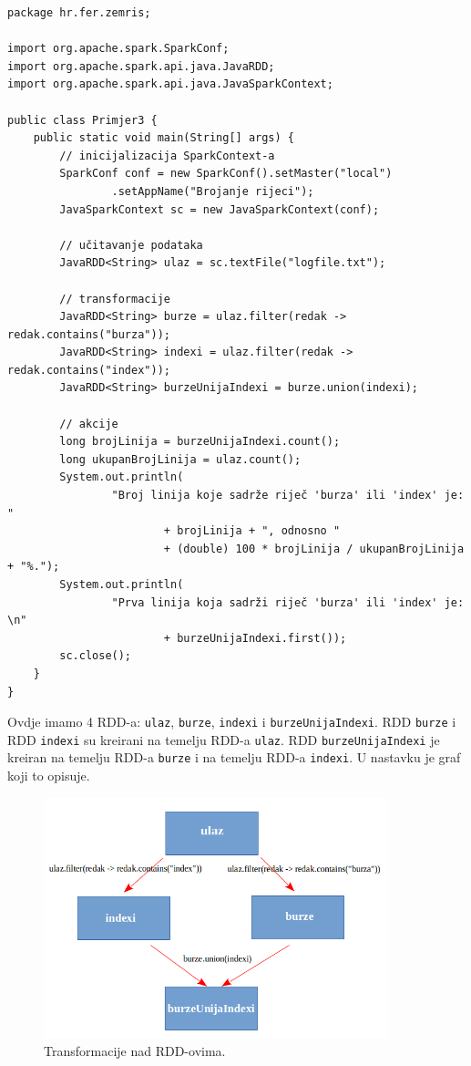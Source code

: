 \documentclass[times, utf8, zavrsni]{fer}
\begin{document}
\vspace{5mm}
\begin{lstlisting}
package hr.fer.zemris;

import org.apache.spark.SparkConf;
import org.apache.spark.api.java.JavaRDD;
import org.apache.spark.api.java.JavaSparkContext;

public class Primjer3 {
	public static void main(String[] args) {
		// inicijalizacija SparkContext-a
		SparkConf conf = new SparkConf().setMaster("local")
				.setAppName("Brojanje rijeci");
		JavaSparkContext sc = new JavaSparkContext(conf);

		// učitavanje podataka
		JavaRDD<String> ulaz = sc.textFile("logfile.txt");

		// transformacije
		JavaRDD<String> burze = ulaz.filter(redak -> redak.contains("burza"));
		JavaRDD<String> indexi = ulaz.filter(redak -> redak.contains("index"));
		JavaRDD<String> burzeUnijaIndexi = burze.union(indexi);

		// akcije
		long brojLinija = burzeUnijaIndexi.count();
		long ukupanBrojLinija = ulaz.count();
		System.out.println(
				"Broj linija koje sadrže riječ 'burza' ili 'index' je: "
						+ brojLinija + ", odnosno "
						+ (double) 100 * brojLinija / ukupanBrojLinija + "%.");
		System.out.println(
				"Prva linija koja sadrži riječ 'burza' ili 'index' je: \n"
						+ burzeUnijaIndexi.first());
		sc.close();
	}
}
\end{lstlisting}
\vspace{5mm}

Ovdje imamo 4 RDD-a: \texttt{ulaz}, \texttt{burze}, \texttt{indexi} i \texttt{burzeUnijaIndexi}. RDD \texttt{burze} i RDD \texttt{indexi} su kreirani na temelju RDD-a \texttt{ulaz}. RDD \texttt{burzeUnijaIndexi} je kreiran na temelju RDD-a \texttt{burze} i na temelju RDD-a \texttt{indexi}. U nastavku je graf koji to opisuje.

\begin{figure}[htb]
\centering
\includegraphics[width=10cm]{img/burzeUnijaIndexiRDD.png}
\caption{Transformacije nad RDD-ovima.}
\label{fig:burzeUnijaIndexiRDD}
\end{figure}
\end{document}
